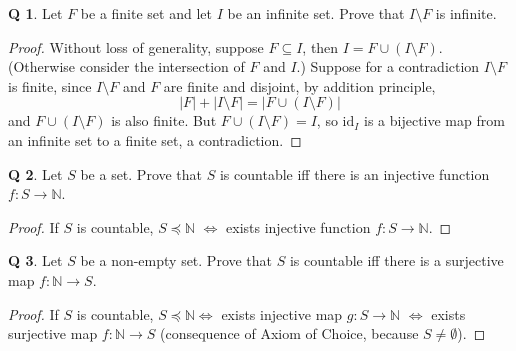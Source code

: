 \documentclass[12pt]{article}
\theoremstyle{definition}
\newtheorem{qn}{Q}
\numberwithin{equation}{qn}
\numberwithin{lemma}{qn}
\newcommand{\nat}{\mathbb{N}}
\newcommand{\idmap}{\mathrm{id}}
\renewcommand{\preceq}{\preccurlyeq}
\begin{document}
\begin{qn}
    Let $F$ be a finite set and let $I$ be an infinite set.
    Prove that $I\setminus F$ is infinite.
\end{qn}
\begin{proof}
    Without loss of generality, suppose $F\subseteq I$, then $I = F \cup(I\setminus F)$.
    (Otherwise consider the intersection of $F$ and $I$.)
    Suppose for a contradiction $I\setminus F$ is finite,
    since $I\setminus F$ and $F$ are finite and disjoint, by addition principle,
    $$|F| + \left|I\setminus F\right| = \left|F\cup (I\setminus F)\right|$$
    and $F\cup(I\setminus F)$ is also finite.
    But $F\cup(I\setminus F) = I$, so $\idmap_I$ is a bijective map
    from an infinite set to a finite set, a contradiction.
\end{proof}

\newpage
\begin{qn}
    Let $S$ be a set.
    Prove that $S$ is countable iff there is an injective function $f:S\rightarrow \nat$.
\end{qn}
\begin{proof}
If $S$ is countable, $S \preceq \nat$
$\iff$ exists injective function $f: S\rightarrow \nat$.
\end{proof}

\begin{qn}
    Let $S$ be a non-empty set.
    Prove that $S$ is countable iff there is a surjective map $f:\nat\rightarrow S$.
\end{qn}
\begin{proof}
    If $S$ is countable, $S\preceq \nat \iff$ exists injective map $g:S\rightarrow \nat$
    $\iff$ exists surjective map $f:\nat\rightarrow S$
    (consequence of Axiom of Choice, because $S \ne \emptyset$).
\end{proof}
\end{document}
